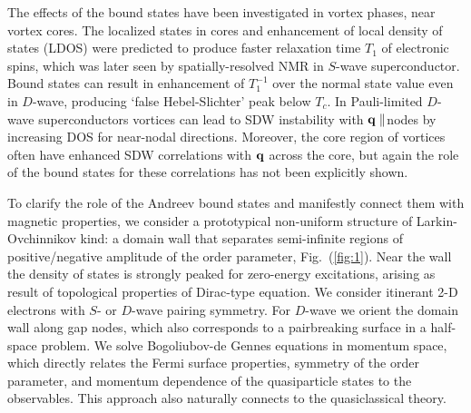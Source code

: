 \documentclass[prb,aps,showpacs,amsmath,twocolumn,10pt]{revtex4-1}
\begin{document}
%

The effects of the bound states have been investigated in vortex phases,
near vortex cores. The localized states in cores and 
enhancement of local density of states (LDOS) were
predicted\cite{Takigawa1999} to produce faster relaxation time $T_1$ of
electronic spins, which was later seen by spatially-resolved NMR in $S$-wave superconductor.\cite{Nakai2008} 
Bound states can result in enhancement of $T_1^{-1}$ over the normal state
value even in $D$-wave,\cite{Tanaka2015} producing 
`false Hebel-Slichter' peak below $T_c$. 
In Pauli-limited $D$-wave superconductors vortices can lead to SDW instability with ${\bf q}
\parallel $nodes by increasing DOS for near-nodal directions.\cite{sdw_vortex}
Moreover, the core region of vortices often have enhanced SDW 
correlations\cite{Ogata1999,JXZhu2001,Ghosal2002} with ${\bf q}$ across the
core, but again the role of the 
bound states for these correlations has not been explicitly shown. 

To clarify the role of the Andreev bound states and manifestly connect them with 
magnetic properties, we consider a prototypical non-uniform
structure of Larkin-Ovchinnikov kind: a domain wall that separates
semi-infinite regions of positive/negative amplitude of the order parameter, 
Fig.~(\ref{fig:1}).
Near the wall the density of states is
strongly peaked for zero-energy excitations, arising as result of topological
properties of Dirac-type equation.\cite{Tanaka2012,Mizushima2016} 
We consider itinerant 2-D electrons with $S$- or $D$-wave pairing symmetry. 
For $D$-wave we orient the domain wall along gap nodes,\cite{Vorontsov2005fflo} 
which also corresponds to a pairbreaking surface in a half-space problem. 
We solve Bogoliubov-de Gennes equations in momentum space, which directly
relates the Fermi surface properties, symmetry of the order parameter, and
momentum dependence of the quasiparticle states 
to the observables. This approach also naturally connects to the quasiclassical theory. 
\end{document}
